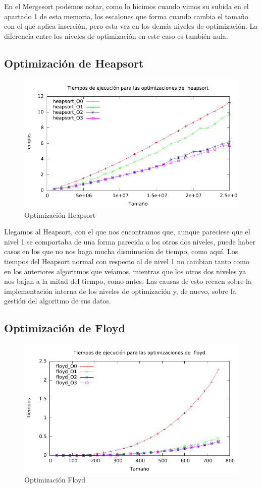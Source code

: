 \documentclass[a4paper, 11pt]{article}
\begin{document}
En el Mergesort podemos notar, como lo hicimos cuando vimos su subida en el apartado 1 de esta memoria, los escalones que forma cuando cambia el tamaño con el que aplica inserción, pero esta vez en los demás niveles de optimización. La diferencia entre los niveles de optimización en este caso es también nula.
\newpage
\subsection{Optimización de Heapsort}

\begin{figure}[H]\includegraphics[width=12cm]{img/heapsort_optim_g.pdf} \centering
	\caption{Optimización Heapsort}\end{figure}

Llegamos al Heapsort, con el que nos encontramos que, aunque pareciese que el nivel 1 se comportaba de una forma parecida a los otros dos niveles, puede haber casos en los que no nos haga mucha disminución de tiempo, como aquí. Los tiempos del Heapsort normal con respecto al de nivel 1 no cambian tanto como en los anteriores algoritmos que veíamos, mientras que los otros dos niveles ya nos bajan a la mitad del tiempo, como antes. Las causas de esto recaen sobre la implementación interna de los niveles de optimización y, de nuevo, sobre la gestión del algoritmo de sus datos.

\newpage
\subsection{Optimización de Floyd}

\begin{figure}[H]\includegraphics[width=13cm]{img/floyd_optim_g.pdf} \centering
	\caption{Optimización Floyd}\end{figure}
\end{document}
